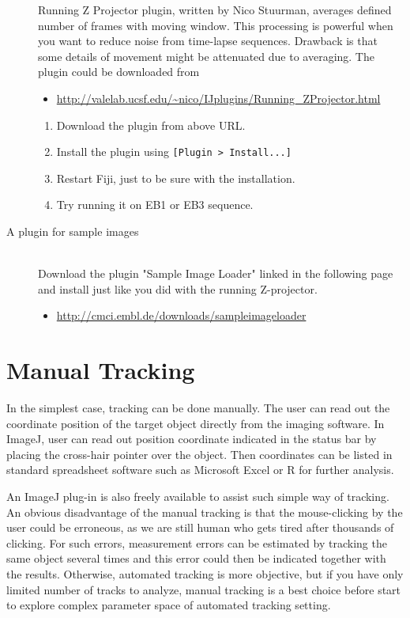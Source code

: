 \documentclass[11pnt]{article}
\begin{document}
\begin{description}
Running Z Projector plugin, written by Nico Stuurman, averages defined number of frames with moving window. This processing is powerful when you want to reduce noise from time-lapse sequences. Drawback is that some details of movement might be attenuated due to averaging. The plugin could be downloaded from
\begin{itemize}
\item\url{http://valelab.ucsf.edu/~nico/IJplugins/Running_ZProjector.html}
\end{itemize}
\begin{enumerate}
\item Download the plugin from above URL.
\item Install the plugin using \verb"[Plugin > Install...]"
\item Restart Fiji, just to be sure with the installation. 
\item Try running it on EB1 or EB3 sequence. 
\end{enumerate}

\item[A plugin for sample images]\hfill\\

Download the plugin "Sample Image Loader" linked in the following page and install just like you did with the running Z-projector. 
\begin{itemize}
\item\url{http://cmci.embl.de/downloads/sampleimageloader}
\end{itemize}

\end{description}

\section{Manual Tracking}

In the simplest case, tracking can be done manually. The user can read
out the coordinate position of the target object directly from the
imaging software. In ImageJ, user can read out position coordinate
indicated in the status bar by placing the cross-hair pointer over the
object. Then coordinates can be listed in standard spreadsheet software
such as Microsoft Excel or R for further analysis. 

An ImageJ plug-in is also freely available to assist such simple way of
tracking. An obvious disadvantage of the manual tracking is that the
mouse-clicking by the user could be erroneous, as we are still human
who gets tired after thousands of clicking. For such errors,
measurement errors can be estimated by tracking the same object several
times and this error could then be indicated together with the results.
Otherwise, automated tracking is more objective, but if you have only
limited number of tracks to analyze, manual tracking is a best choice
before start to explore complex parameter space of automated tracking
setting.
\end{document}
